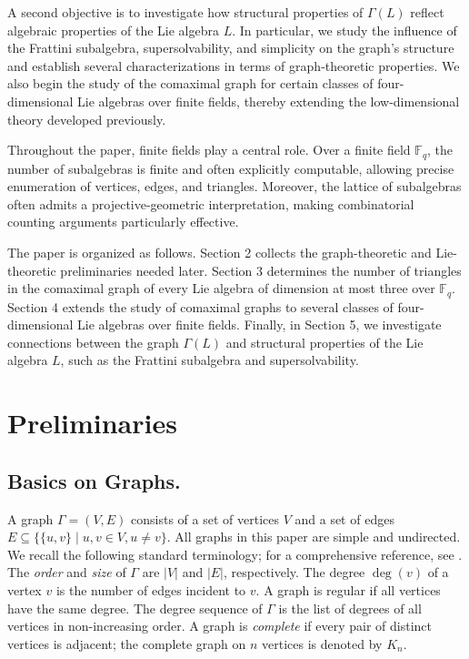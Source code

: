 \documentclass[11pt]{amsart}
\theoremstyle{plain}
\def\F{\mathbb{F}}
\begin{document}
A second objective is to investigate how structural properties of $\Gamma(L)$ reflect algebraic properties of the Lie algebra $L$. In particular, we study the influence of the Frattini subalgebra, supersolvability, and simplicity on the graph's structure and establish several characterizations in terms of graph-theoretic properties. We also begin the study of the comaximal graph for certain classes of four-dimensional Lie algebras over finite fields, thereby extending the
low-dimensional theory developed previously.

Throughout the paper, finite fields play a central role. Over a finite field $\F_q$, the number of subalgebras is finite and often explicitly computable, allowing precise enumeration of vertices, edges, and triangles. Moreover, the lattice of subalgebras often admits a projective-geometric interpretation, making combinatorial counting arguments particularly effective.

The paper is organized as follows. Section 2 collects the graph-theoretic and Lie-theoretic preliminaries needed later. Section 3 determines the number of triangles in the comaximal graph of every Lie algebra of dimension at most three over $\F_q$.
Section 4 extends the study of comaximal graphs to several classes of four-dimensional Lie algebras over finite fields. Finally, in Section 5, we investigate connections between the graph $\Gamma(L)$ and structural properties of the Lie algebra $L$, such as the Frattini subalgebra and supersolvability.


 

\section{Preliminaries}
\subsection*{Basics on Graphs.}
A graph $\Gamma = (V, E)$ consists of a set of vertices $V$ and a set of edges $E\subseteq  \{\{u, v\}\mid u,v \in V, u\neq v\}$. All graphs in this paper are simple and undirected. We recall the following standard terminology; for a comprehensive reference, see \cite{Diestel, West, Bondy}. The \emph{order} and \emph{size} of $\Gamma$ are $|V|$ and $|E|$, respectively. The degree $\deg(v)$ of a vertex $v$ is the number of edges incident to $v$. A graph is regular if all vertices have the same degree. The degree sequence of $\Gamma$ is the list of degrees of all vertices in non-increasing order. A graph is \emph{complete} if every pair of distinct vertices is adjacent; the complete graph on $n$ vertices is denoted by $K_n$.
\end{document}

